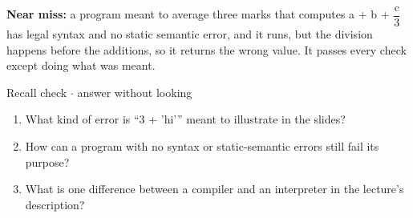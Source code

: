 \documentclass[11pt]{article}
\begin{document}
\begin{keepsection}
\begin{keepsection}
\begin{notebox}\textbf{Near miss:} a program meant to average three marks that computes a + b + {\small\ensuremath{\dfrac{\mathrm{c}}{3}}} has legal syntax and no static semantic error, and it runs, but the division happens before the additions, so it returns the wrong value. It passes every check except doing what was meant.\end{notebox}

\begin{recallbox}{Recall check \ensuremath{\cdot} answer without looking}
\begin{enumerate}
\item What kind of error is “3 + 'hi'” meant to illustrate in the slides?
\item How can a program with no syntax or static-semantic errors still fail its purpose?
\item What is one difference between a compiler and an interpreter in the lecture's description?
\end{enumerate}

\end{recallbox}
\end{keepsection}
\end{keepsection}
\end{document}
